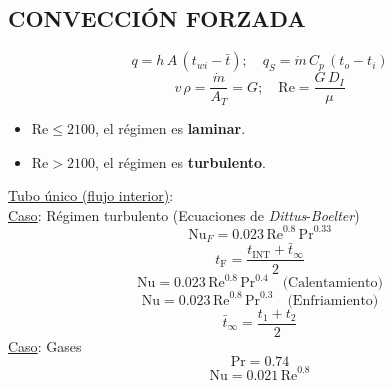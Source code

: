 \documentclass[letter,oneside,10pt]{article}
\begin{document}
\begin{multicols}{3}
\section*{CONVECCIÓN FORZADA}
\vspace{-0.6cm}
\begin{equation*}
    q = h\,A\,(t_{wi} - \bar{t});\quad
    q_S = \dot{m}\,C_p\,(t_o - t_i)
\end{equation*}
\begin{equation*}
    v\,\rho = \frac{\dot{m}}{A_T} = G;\quad
    \text{Re} = \frac{G\,D_I}{\mu}
\end{equation*}
\vspace{-0.3cm}
\tiny
\begin{itemize}
    \item $\text{Re} \le 2100$, el régimen es \textbf{laminar}.
    \item $\text{Re} > 2100$, el régimen es \textbf{turbulento}.
\end{itemize}
\scriptsize
\underline{Tubo único (flujo interior)}:\\
\underline{Caso}: Régimen turbulento (Ecuaciones de
\emph{Dittus}-\emph{Boelter})
\vspace{-0.3cm}
\begin{equation*}
    \text{Nu}_F = 0.023\,\text{Re}^{0.8}\,\text{Pr}^{0.33}
\end{equation*}
\vspace{-0.3cm}
\begin{equation*}
    t_\text{F} = \frac{t_\text{INT} + \bar{t}_{\infty}}{2}
\end{equation*}
\begin{equation*}
    \text{Nu} = 0.023\,\text{Re}^{0.8}\,\text{Pr}^{0.4}
    \quad\text{(Calentamiento)}
\end{equation*}
\vspace{-0.3cm}
\begin{equation*}
    \text{Nu} = 0.023\,\text{Re}^{0.8}\,\text{Pr}^{0.3}
    \quad\text{(Enfriamiento)}
\end{equation*}
\begin{equation*}
    \bar{t}_\infty = \frac{t_1 + t_2}{2}
\end{equation*}
\vspace{-0.3cm}
\underline{Caso}: Gases
\begin{equation*}
    \text{Pr} = 0.74
\end{equation*}
\begin{equation*}
    \text{Nu} = 0.021\,\text{Re}^{0.8}
\end{equation*}

\end{multicols}
\end{document}
